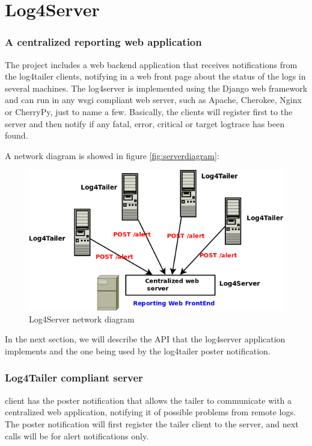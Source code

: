 \part{Log4Server}

\section{A centralized reporting web application}
The \logftailer{} project includes a web backend application that receives notifications 
from the log4tailer clients, notifying in a web front page about the status of the logs 
in several machines. The log4server is implemented using the Django web framework and can run 
in any wsgi compliant web server, such as Apache, Cherokee, Nginx or CherryPy, just to name 
a few. Basically, the clients will register first to the server and then notify if any fatal, 
error, critical or target logtrace has been found. 

A network diagram is showed in figure \autoref{fig:serverdiagram}:

\begin{figure}[hb]
\centering
\includegraphics[scale=0.50]{serverdiagram.png}
\caption{Log4Server network diagram}\label{fig:serverdiagram}
\end{figure}


In the next section, we will describe the API that the log4server application implements and the 
one being used by the log4tailer poster notification.

\section{Log4Tailer compliant server}
\logftailer{} client has the poster notification that allows the tailer to communicate 
with a centralized web application, notifying it of possible problems from remote logs. 
The poster notification will first register the tailer client to the server, and next 
calls will be for alert notifications only.

